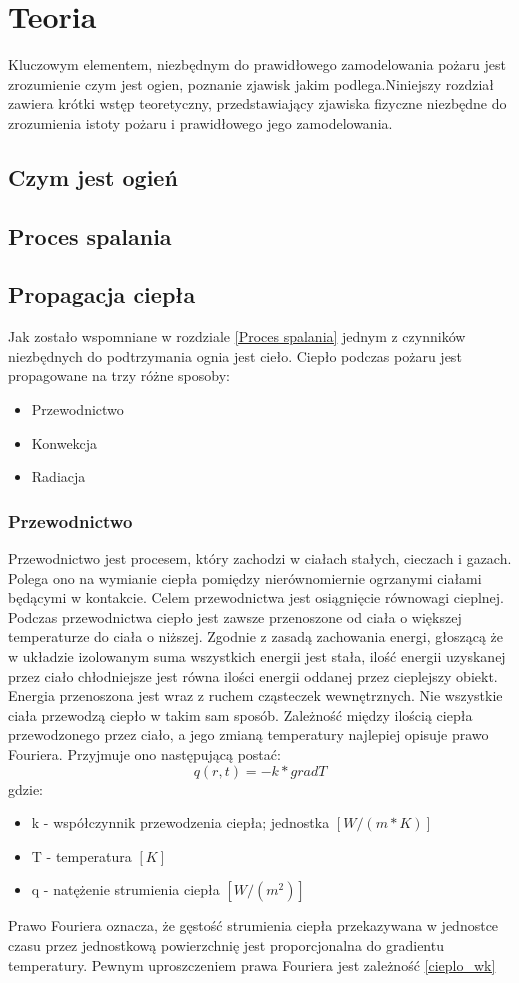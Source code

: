 ﻿\chapter{Teoria}
\label{cha:Teoria}
Kluczowym elementem, niezbędnym do prawidłowego zamodelowania pożaru
jest zrozumienie czym jest ogien, poznanie zjawisk jakim podlega.Niniejszy rozdział zawiera
krótki wstęp teoretyczny, przedstawiający zjawiska fizyczne niezbędne do zrozumienia istoty 
pożaru i prawidłowego jego zamodelowania.
\section {Czym jest ogień}
\section {Proces spalania}
\section {Propagacja ciepła}
Jak zostało wspomniane w rozdziale \ref{Proces spalania} jednym z czynników niezbędnych
do podtrzymania ognia jest cieło. Ciepło podczas pożaru jest propagowane na trzy różne sposoby:
\begin {itemize}
\item Przewodnictwo
\item Konwekcja
\item Radiacja
\end {itemize}
\subsection {Przewodnictwo}
Przewodnictwo jest procesem, który zachodzi w ciałach stałych, cieczach i gazach. Polega ono na wymianie ciepła 
pomiędzy nierównomiernie ogrzanymi ciałami będącymi w kontakcie. Celem przewodnictwa jest 
osiągnięcie równowagi cieplnej. Podczas przewodnictwa ciepło jest zawsze przenoszone od
ciała o większej temperaturze do ciała o niższej. Zgodnie z zasadą zachowania energi, głoszącą że w układzie 
izolowanym suma wszystkich energii jest stała, ilość energii uzyskanej przez ciało chłodniejsze jest równa
ilości energii oddanej przez cieplejszy obiekt. Energia przenoszona jest wraz z ruchem cząsteczek wewnętrznych.
Nie wszystkie ciała przewodzą ciepło w takim sam sposób.
Zależność między ilością ciepła przewodzonego przez ciało, a jego zmianą temperatury najlepiej opisuje prawo Fouriera.
Przyjmuje ono następującą postać:
$$ q(r,t)=-k*grad T$$
gdzie:
\begin {itemize}
\item k - współczynnik przewodzenia ciepła; jednostka $[W / (m*K)]$ \\
\item T - temperatura $[K]$
\item q - natężenie strumienia ciepła $ [W/(m^2)]$
\end {itemize}
Prawo Fouriera oznacza, że gęstość strumienia ciepła przekazywana w jednostce czasu przez jednostkową powierzchnię 
jest proporcjonalna do gradientu temperatury. Pewnym uproszczeniem prawa Fouriera jest zależność \ref {cieplo_wk}

